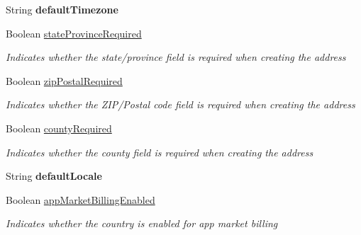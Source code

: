 \begin{DoxyCompactItemize}
String {\bfseries default\+Timezone}
\item 
Boolean \hyperlink{classcom_1_1clover_1_1sdk_1_1v3_1_1base___1_1_country_info_a2faf9d387822900e0e9c6f21554712bd}{state\+Province\+Required}
\begin{DoxyCompactList}\small\item\em Indicates whether the state/province field is required when creating the address \end{DoxyCompactList}\item 
Boolean \hyperlink{classcom_1_1clover_1_1sdk_1_1v3_1_1base___1_1_country_info_af540420a76db1fa9ba7858fb62d35f8e}{zip\+Postal\+Required}
\begin{DoxyCompactList}\small\item\em Indicates whether the Z\+I\+P/\+Postal code field is required when creating the address \end{DoxyCompactList}\item 
Boolean \hyperlink{classcom_1_1clover_1_1sdk_1_1v3_1_1base___1_1_country_info_af70d26e669164501f187ddcd7adcc536}{county\+Required}
\begin{DoxyCompactList}\small\item\em Indicates whether the county field is required when creating the address \end{DoxyCompactList}\item 
\mbox{\label{classcom_1_1clover_1_1sdk_1_1v3_1_1base___1_1_country_info_a222d0fe183cf533e46013f23c703295b}} 
String {\bfseries default\+Locale}
\item 
Boolean \hyperlink{classcom_1_1clover_1_1sdk_1_1v3_1_1base___1_1_country_info_ab3e7a8b2306922cf3864db7aade35a94}{app\+Market\+Billing\+Enabled}
\begin{DoxyCompactList}\small\item\em Indicates whether the country is enabled for app market billing \end{DoxyCompactList}\end{DoxyCompactItemize}


